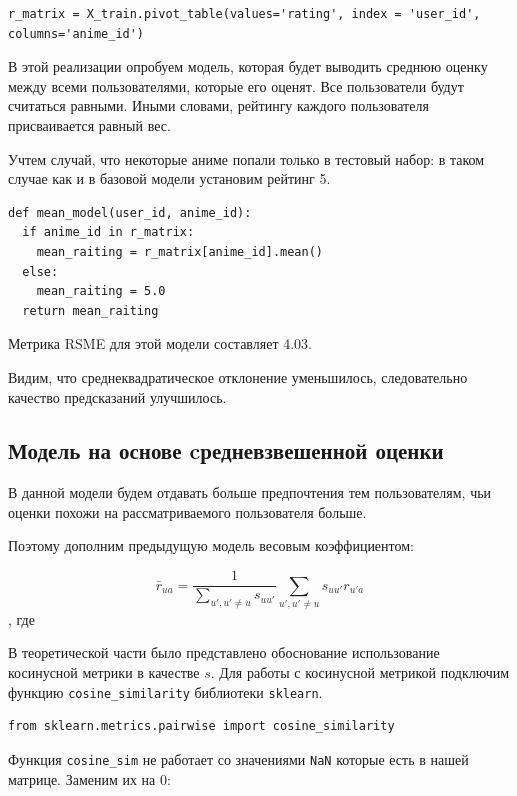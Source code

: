 \documentclass[bachelor, och, diploma]{SCWorks}
\begin{document}
\begin{verbatim}
r_matrix = X_train.pivot_table(values='rating', index = 'user_id', columns='anime_id')
\end{verbatim}

В этой реализации опробуем модель, которая будет выводить среднюю оценку между всеми пользователями, 
которые его оценят. Все пользователи будут считаться равными. Иными словами, рейтингу каждого пользователя присваивается равный вес.

Учтем случай, что некоторые аниме попали только в тестовый набор: в таком случае как и в базовой модели установим рейтинг 5.

\begin{verbatim}
def mean_model(user_id, anime_id):
  if anime_id in r_matrix:
    mean_raiting = r_matrix[anime_id].mean()
  else:
    mean_raiting = 5.0
  return mean_raiting

\end{verbatim}

Метрика RSME для этой модели составляет 4.03.

Видим, что среднеквадратическое отклонение уменьшилось, следовательно качество предсказаний улучшилось.


\subsection{Модель на основе cредневзвешенной оценки}
В данной модели будем отдавать больше предпочтения тем пользователям, чьи оценки похожи на рассматриваемого пользователя больше.

Поэтому дополним предыдущую модель весовым коэффициентом:

$$\bar r_{ua} = \frac{1}{\sum_{u', u' \neq u} s_{uu'}}  \sum_{u', u' \neq u} s_{uu'}r_{u'a}$$, где 

В теоретической части было представлено обоснование использование косинусной метрики в качестве $s$. Для работы с косинусной метрикой подключим функцию \verb|cosine_similarity| библиотеки \verb|sklearn|.

\begin{verbatim}
from sklearn.metrics.pairwise import cosine_similarity
\end{verbatim}

Функция \verb|cosine_sim| не работает со значениями \verb|NaN| которые есть в нашей матрице. Заменим их на 0:
\end{document}
